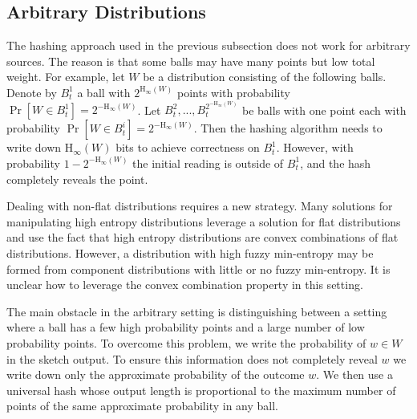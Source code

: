 \documentclass[11pt]{article}
\newcommand{\Hoo}{\mathrm{H}_\infty}
\begin{document}
\subsection{Arbitrary Distributions}
The hashing approach used in the previous subsection does not work for arbitrary sources.  The reason is that some balls may have  many points but low total weight. For example, let $W$ be a distribution consisting of the following balls. Denote by $B^1_t$ a ball with $2^{\Hoo(W)}$ points with probability $\Pr[W\in B^1_t] =2^{-\Hoo(W)}$.  Let $B^2_t,..., B^{2^{-\Hoo(W)}}_t$ be balls with one point each with probability $\Pr[W\in B^i_t] = 2^{-\Hoo(W)}$.  Then the hashing algorithm needs to write down $\Hoo(W)$ bits to achieve correctness on $B^1_t$.  However, with probability $1-2^{-\Hoo(W)}$ the initial reading is outside of $B^1_t$, and the hash completely reveals the point.  

Dealing with non-flat distributions requires a new strategy. 
Many solutions for manipulating high entropy distributions leverage a solution for flat distributions and use the fact that high entropy distributions are convex combinations of flat distributions.  However, a distribution with high fuzzy min-entropy may be formed from component distributions with little or no fuzzy min-entropy.  It is unclear how to leverage the convex combination property in this setting.  

The main obstacle in the arbitrary setting is distinguishing between a setting where a ball has a few high probability points and a large number of low probability points.
To overcome this problem, we write the probability of $w\in W$ in the sketch output.  To ensure this information does not completely reveal $w$ we write down only the approximate probability of the outcome $w$. We then use a universal hash whose output length is proportional to the maximum number of points of the same approximate probability in any ball.  
\end{document}
